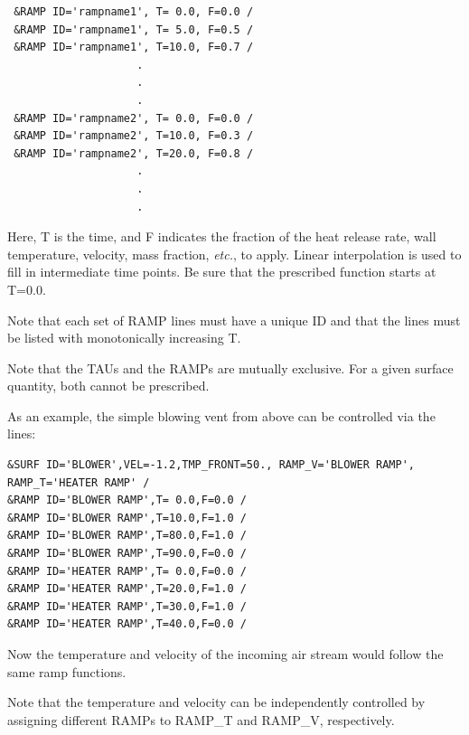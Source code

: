 \documentclass[11pt]{book}
\begin{document}
\footnotesize
\begin{verbatim}
 &RAMP ID='rampname1', T= 0.0, F=0.0 /
 &RAMP ID='rampname1', T= 5.0, F=0.5 /
 &RAMP ID='rampname1', T=10.0, F=0.7 /
                    .
                    .
                    .
 &RAMP ID='rampname2', T= 0.0, F=0.0 /
 &RAMP ID='rampname2', T=10.0, F=0.3 /
 &RAMP ID='rampname2', T=20.0, F=0.8 /
                    .
                    .
                    .
\end{verbatim}
\normalsize

\noindent

Here, {\ct T} is the time, and {\ct F} indicates the fraction of the heat
release rate, wall temperature, velocity, mass fraction, {\em etc.}, to apply.
Linear interpolation is used to fill in intermediate time points.
Be sure that the prescribed function starts at {\ct T=0.0}.

\begin{warning}
\noindent
Note that each set of {\ct RAMP} lines must have a unique {\ct ID} and that the lines must
be listed with monotonically increasing {\ct T}.
\end{warning}

\begin{warning}
\noindent
Note that the {\ct TAU}s and the {\ct RAMP}s are mutually exclusive. For a given
surface quantity, both cannot be prescribed.
\end{warning}

As an example, the simple blowing vent from above can be controlled via the lines:

\footnotesize
\begin{verbatim}
&SURF ID='BLOWER',VEL=-1.2,TMP_FRONT=50., RAMP_V='BLOWER RAMP', RAMP_T='HEATER RAMP' /
&RAMP ID='BLOWER RAMP',T= 0.0,F=0.0 /
&RAMP ID='BLOWER RAMP',T=10.0,F=1.0 /
&RAMP ID='BLOWER RAMP',T=80.0,F=1.0 /
&RAMP ID='BLOWER RAMP',T=90.0,F=0.0 /
&RAMP ID='HEATER RAMP',T= 0.0,F=0.0 /
&RAMP ID='HEATER RAMP',T=20.0,F=1.0 /
&RAMP ID='HEATER RAMP',T=30.0,F=1.0 /
&RAMP ID='HEATER RAMP',T=40.0,F=0.0 /
\end{verbatim}
\normalsize

\noindent
Now the temperature and velocity of the incoming air stream would
follow the same ramp functions.

\begin{warning}
\noindent
Note that the temperature and
velocity can be independently controlled by assigning different
{\ct RAMP}s to {\ct RAMP\_T} and {\ct RAMP\_V}, respectively.
\end{warning}
\end{document}
